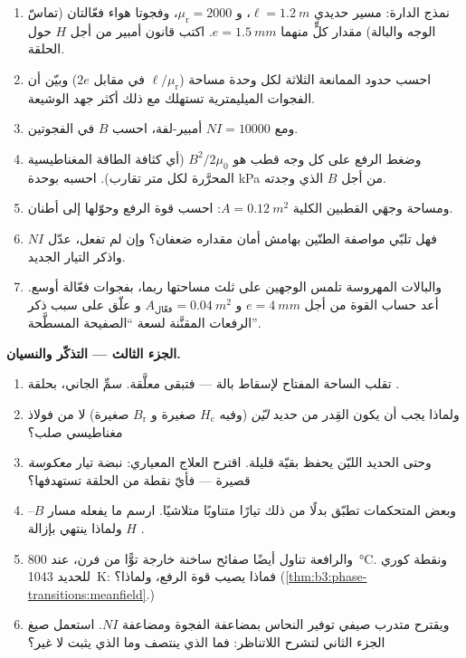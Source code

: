 \begin{problem}
\begin{enumerate}[resume]
  \item نمذج الدارة: مسير حديدي $\ell = \qty{1.2}{m}$، و
        $\mu_{\text{r}} = 2000$، وفجوتا هواء فعّالتان
        (تماسّ الوجه والبالة) مقدار كلٍّ منهما $e = \qty{1.5}{mm}$. اكتب
        قانون أمبير من أجل $H$ حول الحلقة.
  \item احسب حدود الممانعة الثلاثة لكل وحدة مساحة
        ($\ell/\mu_{\text{r}}$ في مقابل $2e$) وبيّن أن الفجوات
        الميليمترية تستهلك مع ذلك أكثر جهد الوشيعة.
  \item ومع $NI = \num{10000}$ أمبير-لفة، احسب $B$ في
        الفجوتين.
  \item وضغط الرفع على كل وجه قطب هو $B^2/2\mu_0$
        (أي كثافة الطاقة المغناطيسية المحرَّرة لكل متر تقارب).
        احسبه بوحدة \unit{kPa} من أجل $B$ الذي وجدته.
  \item ومساحة وجهَي القطبين الكلية $A = \qty{0.12}{m^2}$: احسب
        قوة الرفع وحوّلها إلى أطنان.
  \item فهل تلبّي مواصفة الطنّين بهامش أمان مقداره
        ضعفان؟ وإن لم تفعل، عدّل $NI$ واذكر التيار الجديد.
  \item والبالات المهروسة تلمس الوجهين على ثلث مساحتها ربما،
        بفجوات فعّالة أوسع. أعد حساب القوة من أجل
        $e = \qty{4}{mm}$ و $A_{\text{فعّال}} = \qty{0.04}{m^2}$ و
        علّق على سبب ذكر الرفعات المقنَّنة لسعة ``الصفيحة المسطَّحة''.
\end{enumerate}

\medskip\noindent\textbf{الجزء الثالث --- التذكّر والنسيان.}

\begin{enumerate}[resume]
  \item تقلب الساحة المفتاح لإسقاط بالة --- فتبقى
        معلَّقة. سمِّ الجاني، بحلقة .
  \item ولماذا يجب أن يكون القِدر من حديد \emph{ليّن} (وفيه
        $H_{\text{c}}$ صغيرة و $B_{\text{r}}$ صغيرة) لا من فولاذ
        مغناطيسي صلب؟
  \item وحتى الحديد الليّن يحفظ بقيّة قليلة. اقترح العلاج
        المعياري: نبضة تيار \emph{معكوسة} قصيرة ---
        فأيّ نقطة من الحلقة تستهدفها؟
  \item وبعض المتحكمات تطبّق بدلًا من ذلك تيارًا متناوبًا متلاشيًا.
        ارسم ما يفعله مسار $B$--$H$ ولماذا
        ينتهي بإزالة .
  \item والرافعة تناول أيضًا صفائح ساخنة خارجة توًّا من فرن،
        عند \qty{800}{\celsius}. ونقطة كوري للحديد
        \qty{1043}{K}: فماذا يصيب قوة الرفع، ولماذا؟
        (\cref{thm:b3:phase-transitions:meanfield}.)
  \item ويقترح متدرب صيفي توفير النحاس بمضاعفة
        الفجوة ومضاعفة $NI$. استعمل صيغ الجزء الثاني
        لتشرح اللاتناظر: فما الذي ينتصف وما الذي يثبت لا غير؟
\end{enumerate}


\end{problem}
